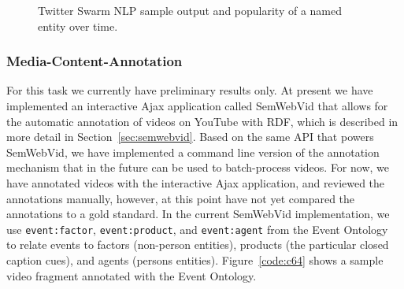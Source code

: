 \documentclass[12pt]{article}
\begin{document}
\begin{figure}[htb!]
  \begin{center}
\hspace{5pt}
  \caption{Twitter Swarm NLP sample output and popularity of a named entity over time.}
  \label{fig:overtime}
  \end{center}  
\end{figure}

\subsubsection{Media-Content-Annotation}
For this task we currently have preliminary results only. At present we have implemented an interactive Ajax application called SemWebVid that allows for the automatic annotation of videos on YouTube with RDF, which is described in more detail in Section~\ref{sec:semwebvid}. Based on the same API that powers SemWebVid, we have implemented a command line version of the annotation mechanism that in the future can be used to batch-process videos. For now, we have annotated videos with the interactive Ajax application, and reviewed the annotations manually, however, at this point have not yet compared the annotations to a gold standard. In the current SemWebVid implementation, we use \texttt{event:factor}, \texttt{event:product}, and \texttt{event:agent} from the Event Ontology~\cite{Raimond:Event} to relate events to factors (non-person entities), products (the particular closed caption cues), and agents (persons entities). Figure~\ref{code:c64} shows a sample video fragment annotated with the Event Ontology.
\end{document}

